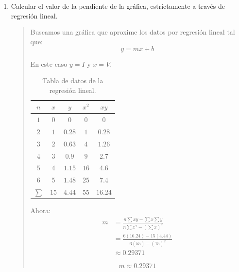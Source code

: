 \documentclass{article}
\begin{document}
\begin{enumerate}[label=\alph*.-]
        \item Calcular el valor de la pendiente de la gráfica, estrictamente a través de regresión lineal.
        
        \begin{quote}
            Buscamos una gráfica que aproxime los datos por regresión lineal tal que:
            \[
                y = mx + b
            \]

            En este caso $y = I$ y $x = V$.

            \begin{table}[ht]
                \centering
                \begin{tabular}{|c|c|c|c|c|} %
                    \midrule    %
                    $n$     & $x$   & $y$       & $x^2$ & $xy$      \\
                    \midrule
                    $1$     & $0$   & $0$       & $0$   & $0$       \\
                    $2$     & $1$   & $0.28$    & $1$   & $0.28$    \\
                    $3$     & $2$   & $0.63$    & $4$   & $1.26$    \\
                    $4$     & $3$   & $0.9$     & $9$   & $2.7$     \\
                    $5$     & $4$   & $1.15$    & $16$  & $4.6$     \\
                    $6$     & $5$   & $1.48$    & $25$  & $7.4$     \\
                    \midrule
                    $\sum$  & $15$  & $4.44$    & $55$  & $16.24$   \\
                    \midrule
                \end{tabular}
                \caption{Tabla de datos de la regresión lineal.}
            \end{table}

            Ahora:
            \begin{align*}
                m &= \frac{n \sum xy - \sum x \sum y}{n \sum x^2 - {\left(\sum x\right)}^2}\\[3px]
                &= \frac{6 (16.24) - 15 (4.44)}{6 (55) - {\left(15\right)}^2}\\[3px]
                &\approx 0.29371
            \end{align*}

            \[
                \boxed{m \approx 0.29371}
            \]
        \end{quote}
        

\end{enumerate}
\end{document}
